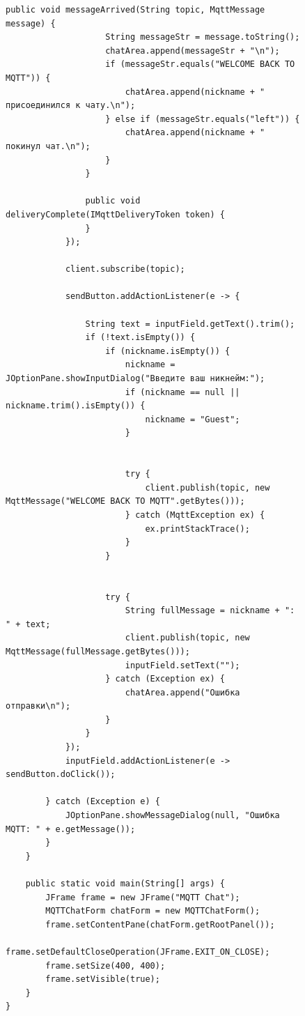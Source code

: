 \documentclass[a4paper, 14pt]{extarticle}
\begin{document}
\begin{figure}[!htb]
\begin{lstlisting}[language={},caption={реализация MQTT чата},label={lst:code5}]
                public void messageArrived(String topic, MqttMessage message) {
                    String messageStr = message.toString();
                    chatArea.append(messageStr + "\n");
                    if (messageStr.equals("WELCOME BACK TO MQTT")) {
                        chatArea.append(nickname + " присоединился к чату.\n");
                    } else if (messageStr.equals("left")) {
                        chatArea.append(nickname + " покинул чат.\n");
                    }
                }

                public void deliveryComplete(IMqttDeliveryToken token) {
                }
            });

            client.subscribe(topic);

            sendButton.addActionListener(e -> {

                String text = inputField.getText().trim();
                if (!text.isEmpty()) {
                    if (nickname.isEmpty()) {
                        nickname = JOptionPane.showInputDialog("Введите ваш никнейм:");
                        if (nickname == null || nickname.trim().isEmpty()) {
                            nickname = "Guest";
                        }


                        try {
                            client.publish(topic, new MqttMessage("WELCOME BACK TO MQTT".getBytes()));
                        } catch (MqttException ex) {
                            ex.printStackTrace();
                        }
                    }


                    try {
                        String fullMessage = nickname + ": " + text;
                        client.publish(topic, new MqttMessage(fullMessage.getBytes()));
                        inputField.setText("");
                    } catch (Exception ex) {
                        chatArea.append("Ошибка отправки\n");
                    }
                }
            });
            inputField.addActionListener(e -> sendButton.doClick());

        } catch (Exception e) {
            JOptionPane.showMessageDialog(null, "Ошибка MQTT: " + e.getMessage());
        }
    }

    public static void main(String[] args) {
        JFrame frame = new JFrame("MQTT Chat");
        MQTTChatForm chatForm = new MQTTChatForm();
        frame.setContentPane(chatForm.getRootPanel());
        frame.setDefaultCloseOperation(JFrame.EXIT_ON_CLOSE);
        frame.setSize(400, 400);
        frame.setVisible(true);
    }
}

\end{lstlisting}
\end{figure}
\clearpage
\newpage
\end{document}
